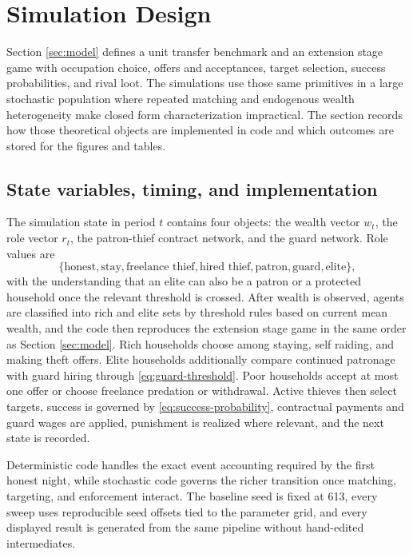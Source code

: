 \section{Simulation Design}
\label{sec:simulation}

Section \ref{sec:model} defines a unit transfer benchmark and an extension stage game with occupation choice, offers and acceptances, target selection, success probabilities, and rival loot. The simulations use those same primitives in a large stochastic population where repeated matching and endogenous wealth heterogeneity make closed form characterization impractical. The section records how those theoretical objects are implemented in code and which outcomes are stored for the figures and tables.

\subsection{State variables, timing, and implementation}

The simulation state in period $t$ contains four objects: the wealth vector $w_t$, the role vector $r_t$, the patron-thief contract network, and the guard network. Role values are
\[
\{\text{honest}, \text{stay}, \text{freelance thief}, \text{hired thief}, \text{patron}, \text{guard}, \text{elite}\},
\]
with the understanding that an elite can also be a patron or a protected household once the relevant threshold is crossed. After wealth is observed, agents are classified into rich and elite sets by threshold rules based on current mean wealth, and the code then reproduces the extension stage game in the same order as Section \ref{sec:model}. Rich households choose among staying, self raiding, and making theft offers. Elite households additionally compare continued patronage with guard hiring through \eqref{eq:guard-threshold}. Poor households accept at most one offer or choose freelance predation or withdrawal. Active thieves then select targets, success is governed by \eqref{eq:success-probability}, contractual payments and guard wages are applied, punishment is realized where relevant, and the next state is recorded.

Deterministic code handles the exact event accounting required by the first honest night, while stochastic code governs the richer transition once matching, targeting, and enforcement interact. The baseline seed is fixed at 613, every sweep uses reproducible seed offsets tied to the parameter grid, and every displayed result is generated from the same pipeline without hand-edited intermediates.

